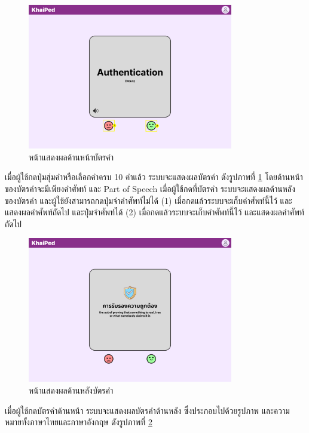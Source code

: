 \documentclass[12pt,oneside,openright,a4paper]{cpe-thai-project}
\begin{document}
\begin{figure}[!h]\centering
	\includegraphics[width=0.8\textwidth, keepaspectratio=true]{image/chap3/ui/flashcard/Flashcard - Show Card.png}
	\caption{หน้าแสดงผลด้านหน้าบัตรคำ}\label{fig:UI_ShowCard}
\end{figure}
\hspace{1cm}
เมื่อผู้ใช้กดปุ่มสุ่มคำหรือเลือกคำครบ 10 คำแล้ว ระบบจะแสดงผลบัตรคำ ดังรูปภาพที่ \ref{fig:UI_ShowCard} โดยด้านหน้าของบัตรคำจะมีเพียงคำศัพท์ และ Part of Speech เมื่อผู้ใช้กดที่บัตรคำ
ระบบจะแสดงผลด้านหลังของบัตรคำ และผู้ใช้ยังสามารถกดปุ่มจำคำศัพท์ไม่ได้ (1) เมื่อกดแล้วระบบจะเก็บคำศัพท์นี้ไว้ และแสดงผลคำศัพท์ถัดไป และปุ่มจำศัพท์ได้ (2)
เมื่อกดแล้วระบบจะเก็บคำศัพท์นี้ไว้ และแสดงผลคำศัพท์ถัดไป

\pagebreak
\begin{figure}[!h]\centering
	\includegraphics[width=0.8\textwidth, keepaspectratio=true]{image/chap3/ui/flashcard/Flashcard - Flip Card.png}
	\caption{หน้าแสดงผลด้านหลังบัตรคำ}\label{fig:UI_FlipCard}
\end{figure}
\hspace{1cm}
เมื่อผู้ใช้กดบัตรคำด้านหน้า ระบบจะแสดงผลบัตรคำด้านหลัง ซึ่งประกอบไปด้วยรูปภาพ และความหมายทั้งภาษาไทยและภาษาอังกฤษ ดังรูปภาพที่ \ref{fig:UI_FlipCard}
\end{document}
